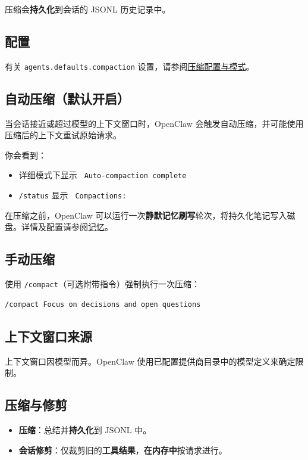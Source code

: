 压缩会\textbf{持久化}到会话的 JSONL 历史记录中。

\subsection{配置}


有关 \texttt{agents.defaults.compaction} 设置，请参阅\href{/concepts/compaction}{压缩配置与模式}。

\subsection{自动压缩（默认开启）}


当会话接近或超过模型的上下文窗口时，OpenClaw 会触发自动压缩，并可能使用压缩后的上下文重试原始请求。

你会看到：

\begin{itemize}
  \item 详细模式下显示 \texttt{ Auto-compaction complete}
  \item \texttt{/status} 显示 \texttt{ Compactions: }
\end{itemize}


在压缩之前，OpenClaw 可以运行一次\textbf{静默记忆刷写}轮次，将持久化笔记写入磁盘。详情及配置请参阅\href{/concepts/memory}{记忆}。

\subsection{手动压缩}


使用 \texttt{/compact}（可选附带指令）强制执行一次压缩：

\begin{lstlisting}
/compact Focus on decisions and open questions
\end{lstlisting}


\subsection{上下文窗口来源}


上下文窗口因模型而异。OpenClaw 使用已配置提供商目录中的模型定义来确定限制。

\subsection{压缩与修剪}


\begin{itemize}
  \item \textbf{压缩}：总结并\textbf{持久化}到 JSONL 中。
  \item \textbf{会话修剪}：仅裁剪旧的\textbf{工具结果}，\textbf{在内存中}按请求进行。
\end{itemize}


